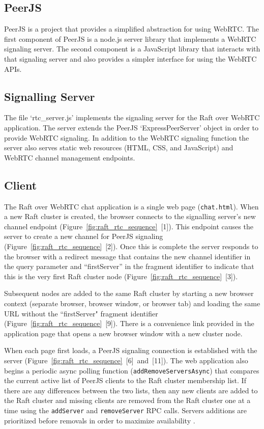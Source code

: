 \documentclass[conference,compsoc]{./IEEEtran/IEEEtran}
\begin{document}
\subsection{PeerJS}

PeerJS is a project that provides a simplified abstraction for using WebRTC. The first component of PeerJS is a node.js server library that implements a WebRTC signaling server. The second component is a JavaScript library that interacts with that signaling server and also provides a simpler interface for using the WebRTC APIs.

\subsection{Signalling Server}

The file `rtc\_server.js' implements the signaling server for the Raft over WebRTC application. The server extends the PeerJS `ExpressPeerServer' object in order to provide WebRTC signaling. In addition to the WebRTC signaling function the server also serves static web resources (HTML, CSS, and JavaScript) and WebRTC channel management endpoints.

\subsection{Client}

The Raft over WebRTC chat application is a single web page (\texttt{chat.html}). When a new Raft cluster is created, the browser connects to the signalling server's new channel endpoint (Figure~\ref{fig:raft_rtc_sequence}~[1]). This endpoint causes the server to create a new channel for PeerJS signaling (Figure~\ref{fig:raft_rtc_sequence}~[2]). Once this is complete the server responds to the browser with a redirect message that contains the new channel identifier in the query parameter and ``firstServer” in the fragment identifier to indicate that this is the very first Raft cluster node (Figure~\ref{fig:raft_rtc_sequence}~[3]).

Subsequent nodes are added to the same Raft cluster by starting a new browser context (separate browser, browser window, or browser tab) and loading the same URL without the ``firstServer" fragment identifier (Figure~\ref{fig:raft_rtc_sequence}~[9]). There is a convenience link provided in the application page that opens a new browser window with a new cluster node.

When each page first loads, a PeerJS signaling connection is established with the server (Figure~\ref{fig:raft_rtc_sequence}~[6]~and~[11]). The web application also begins a periodic async polling function (\texttt{addRemoveServersAsync}) that compares the current active list of PeerJS clients to the Raft cluster membership list. If there are any differences between the two lists, then any new clients are added to the Raft cluster and missing clients are removed from the Raft cluster one at a time using the \texttt{addServer} and \texttt{removeServer} RPC calls. Servers additions are prioritized before removals in order to maximize availability \cite[Section~4.4]{raft_thesis:ongaro14}.
\end{document}
